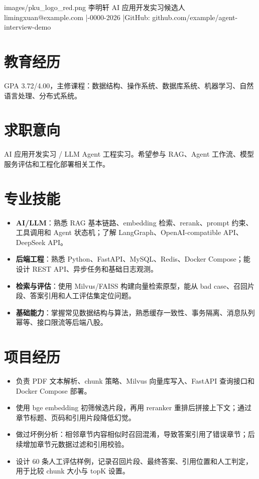 \documentclass{resume}
\begin{document}

\resumeheader
  {images/pku_logo_red.png}
  {李明轩 \quad AI 应用开发实习候选人}
  {limingxuan@example.com \quad|-0000-2026 \quad|\quad GitHub: github.com/example/agent-interview-demo}
  {}

\section{教育经历}
GPA 3.72/4.00，主修课程：数据结构、操作系统、数据库系统、机器学习、自然语言处理、分布式系统。

\section{求职意向}
AI 应用开发实习 / LLM Agent 工程实习。希望参与 RAG、Agent 工作流、模型服务评估和工程化部署相关工作。

\section{专业技能}
\begin{itemize}
  \item \textbf{AI/LLM}：熟悉 RAG 基本链路、embedding 检索、rerank、prompt 约束、工具调用和 Agent 状态机；了解 LangGraph、OpenAI-compatible API、DeepSeek API。
  \item \textbf{后端工程}：熟悉 Python、FastAPI、MySQL、Redis、Docker Compose；能设计 REST API、异步任务和基础日志观测。
  \item \textbf{检索与评估}：使用 Milvus/FAISS 构建向量检索原型，能从 bad case、召回片段、答案引用和人工评估集定位问题。
  \item \textbf{基础能力}：掌握常见数据结构与算法，熟悉缓存一致性、事务隔离、消息队列幂等、接口限流等后端八股。
\end{itemize}

\section{项目经历}
\begin{itemize}
  \item 负责 PDF 文本解析、chunk 策略、Milvus 向量库写入、FastAPI 查询接口和 Docker Compose 部署。
  \item 使用 bge embedding 初筛候选片段，再用 reranker 重排后拼接上下文；通过章节标题、页码和引用片段降低幻觉。
  \item 做过坏例分析：相邻章节内容相似时召回混淆，导致答案引用了错误章节；后续增加章节元数据过滤和引用校验。
  \item 设计 60 条人工评估样例，记录召回片段、最终答案、引用位置和人工判定，用于比较 chunk 大小与 topK 设置。
\end{itemize}
\end{document}
